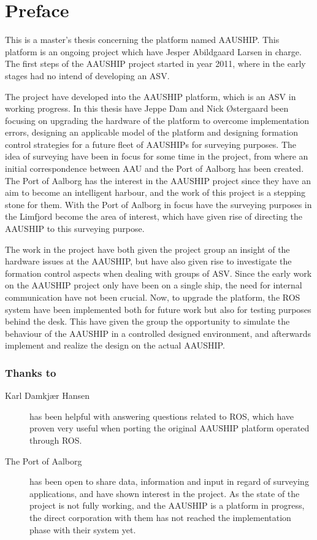 \chapter{Preface}
This is a master's thesis concerning the platform named AAUSHIP. This
platform is an ongoing project which have Jesper Abildgaard Larsen in
charge. The first steps of the AAUSHIP project started in year 2011,
where in the early stages had no intend of developing an \acf{ASV}.

The project have developed into the AAUSHIP platform, which is an
\ac{ASV} in working progress. In this thesis have Jeppe Dam and Nick
Østergaard been focusing on upgrading the hardware of the platform to
overcome implementation errors, designing an applicable model of the
platform and designing formation control strategies for a future fleet
of AAUSHIPs for surveying purposes. The idea of surveying have been in
focus for some time in the project, from where an initial
correspondence between \acf{AAU} and the Port of Aalborg has been created. The Port of Aalborg has the interest in the AAUSHIP project since they have an aim to
become an intelligent harbour, and the work of this project is a
stepping stone for them. With the Port of Aalborg in focus have the surveying
purposes in the Limfjord become the area of interest, which have given
rise of directing the AAUSHIP to this surveying purpose.

The work in the project have both given the project group an insight
of the hardware issues at the AAUSHIP, but have also given rise to
investigate the formation control aspects when dealing with groups of
\ac{ASV}. Since the early work on the AAUSHIP project only have been
on a single ship, the need for internal communication have not been
crucial. Now, to upgrade the platform, the ROS system have been
implemented both for future work but also for testing purposes behind
the desk. This have given the group the opportunity to simulate the
behaviour of the AAUSHIP in a controlled designed environment, and
afterwards implement and realize the design on the actual AAUSHIP.
\newpage

\subsection*{Thanks to}
\begin{description}
\item[Karl Damkjær Hansen] has been helpful with answering questions
	related to ROS, which have proven very useful when
	porting the original AAUSHIP platform operated through ROS. 
\item[The Port of Aalborg] has been open to share data, information and
	input in regard of surveying applications, and have shown interest in
	the project. As the state of the project is not fully working,
	and the AAUSHIP is a platform in progress, the direct corporation
	with them has not reached the implementation phase with their system
	yet.  
\end{description}


